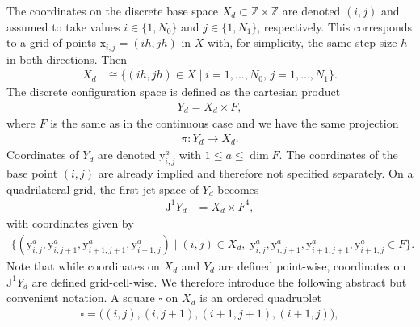 \documentclass[12pt,a4paper,reqno]{article}
\begin{document}
The coordinates on the discrete base space $X_{d} \subset \mathbb{Z} \times \mathbb{Z}$ are denoted $(i,j)$ and assumed to take values $i \in \{ 1, N_{0} \}$ and $j \in \{ 1, N_{1} \}$, respectively.
This corresponds to a grid of points ${\ensuremath{{\ensuremath{\mathrm{{x}}}}}}_{i,j} = (ih, jh)$ in $X$ with, for simplicity, the same step size $h$ in both directions.
Then
\begin{align}\label{eq:vi_discrete_base_space}
X_{d} &\cong \big\{ (ih, jh) \in X \; \big\vert \; i=1, ..., N_{0}, \, j=1, ..., N_{1} \big\} .
\end{align}
The discrete configuration space is defined as the cartesian product
\begin{align}\label{eq:vi_discrete_configuration_space}
Y_{d} = X_{d} \times F ,
\end{align}
where $F$ is the same as in the continuous case and we have the same projection
\begin{align}
\pi : Y_{d} \rightarrow X_{d} .
\end{align}
Coordinates of $Y_{d}$ are denoted ${\ensuremath{{\ensuremath{\mathrm{{y}}}}}}^{a}_{i,j}$ with $1 \leq a \leq \dim F$. The coordinates of the base point $(i,j)$ are already implied and therefore not specified separately.
On a quadrilateral grid, the first jet space of $Y_{d}$ becomes \cite{MarsdenPatrick:1998}
\begin{align}\label{eq:vi_discrete_jet_space}
{\ensuremath{\mathrm{J}}}^{1} Y_{d}
&= X_{d} \times F^{4} ,
\end{align}
with coordinates given by
\begin{align}
\big\{ ( {\ensuremath{{\ensuremath{\mathrm{{y}}}}}}^{a}_{i,j} , {\ensuremath{{\ensuremath{\mathrm{{y}}}}}}^{a}_{i,j+1} , {\ensuremath{{\ensuremath{\mathrm{{y}}}}}}^{a}_{i+1,j+1} , {\ensuremath{{\ensuremath{\mathrm{{y}}}}}}^{a}_{i+1,j} ) \; \big\vert \; (i,j) \in X_{d}, \; {\ensuremath{{\ensuremath{\mathrm{{y}}}}}}^{a}_{i,j} , {\ensuremath{{\ensuremath{\mathrm{{y}}}}}}^{a}_{i,j+1} , {\ensuremath{{\ensuremath{\mathrm{{y}}}}}}^{a}_{i+1,j+1} , {\ensuremath{{\ensuremath{\mathrm{{y}}}}}}^{a}_{i+1,j} \in F \big\} .
\end{align}
Note that while coordinates on $X_{d}$ and $Y_{d}$ are defined point-wise, coordinates on ${\ensuremath{\mathrm{J}}}^{1} Y_{d}$ are defined grid-cell-wise.
We therefore introduce the following abstract but convenient notation.
A square $\square$ on $X_{d}$ is an ordered quadruplet
\begin{align}
\square = \big( (i, j), (i, j+1), (i+1, j+1), (i+1, j) \big) ,
\end{align}
\end{document}
